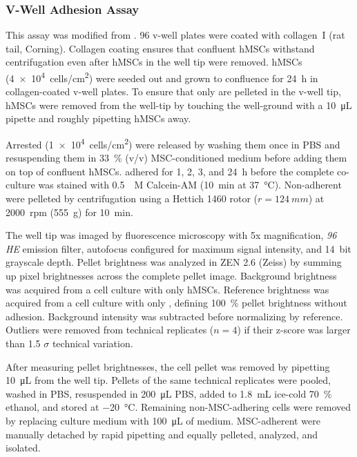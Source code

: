 \subsubsection*{V-Well Adhesion Assay}
This assay was modified from \cite{weetallHomogeneousFluorometricAssay2001}.
96 v-well plates were coated with collagen~I (rat tail, Corning). Collagen
coating ensures that confluent hMSCs withstand centrifugation even after hMSCs
in the well tip were removed. hMSCs (\SI{4e4}{cells/cm^2}) were seeded out and
grown to confluence for \SI{24}{\hour} in collagen-coated v-well plates. To
ensure that only \INA are pelleted in the v-well tip, hMSCs were removed from
the well-tip by touching the well-ground with a \SI{10}{\micro\liter} pipette
and roughly pipetting hMSCs away.

Arrested \INA (\SI{1e4}{cells/cm^2}) were released by washing them once in PBS
and resuspending them in \SI{33}{\percent} (v/v) MSC-conditioned medium before
adding them on top of confluent hMSCs. \INA adhered for 1, 2, 3, and
\SI{24}{\hour} before the complete co-culture was stained with \SI{0.5}{\micro
    M} Calcein-AM (\SI{10}{\minute} at \SI{37}{\degreeCelsius}). Non-adherent \INA
were pelleted by centrifugation using a Hettich 1460 rotor (\(r =
\SI{124}{mm}\)) at \SI{2000}{rpm} (\SI{555}{g}) for \SI{10}{\minute}.

The well tip was imaged by fluorescence microscopy with 5x magnification,
\textit{96 HE} emission filter, autofocus configured for maximum signal intensity,
 and \SI{14}{bit} grayscale depth. Pellet brightness was
analyzed in ZEN 2.6 (Zeiss) by summing up pixel brightnesses across the complete
pellet image. Background brightness was acquired from a cell culture with only
hMSCs. Reference brightness was acquired from a cell culture with only \INA,
defining \SI{100}{\percent} pellet brightness without adhesion. Background
intensity was subtracted before normalizing by reference. Outliers were removed
from technical replicates (\(n=4\)) if their z-score was larger than
1.5 $\sigma$ technical variation.

After measuring pellet brightnesses, the cell pellet was removed by pipetting
\SI{10}{\micro\liter} from the well tip. Pellets of the same technical
replicates were pooled, washed in PBS, resuspended in \SI{200}{\micro\liter}
PBS, added to \SI{1.8}{mL} ice-cold \SI{70}{\percent} ethanol, and stored at
\SI{-20}{\degreeCelsius}. Remaining non-MSC-adhering \INA cells were removed by
replacing culture medium with \SI{100}{\micro\liter} of medium. MSC-adherent
\INA were manually detached by rapid pipetting and equally pelleted, analyzed,
and isolated.


